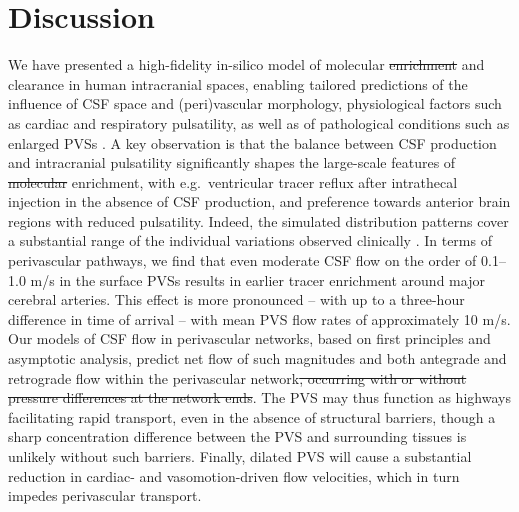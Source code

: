 \documentclass[fleqn,10pt]{wlscirep}
\providecommand{\DIFadd}[1]{{\protect\color{blue}\uwave{#1}}} %
\providecommand{\DIFdel}[1]{{\protect\color{red}\sout{#1}}}                      %
\providecommand{\DIFaddbegin}{} %
\providecommand{\DIFaddend}{} %
\providecommand{\DIFdelbegin}{} %
\providecommand{\DIFdelend}{} %
\begin{document}
\section*{Discussion}

We have presented a high-fidelity in-silico model of molecular
\DIFdelbegin \DIFdel{enrichment }\DIFdelend \DIFaddbegin \DIFadd{transport }\DIFaddend and clearance in human intracranial spaces, enabling
tailored predictions of the influence of CSF space and (peri)vascular
morphology, physiological factors such as cardiac and respiratory
pulsatility, as well as of pathological conditions such as enlarged
PVSs \DIFaddbegin \DIFadd{in the SAS}\DIFaddend . A key observation is that the balance between CSF
production and intracranial pulsatility significantly shapes the
large-scale features of \DIFdelbegin \DIFdel{molecular }\DIFdelend \DIFaddbegin \DIFadd{tracer }\DIFaddend enrichment, with e.g.~ventricular
tracer reflux after intrathecal injection in the absence of CSF
production, and preference towards anterior brain regions with reduced
pulsatility. Indeed, the simulated distribution patterns cover a
substantial range of the individual variations observed clinically
\cite{ringstad2018brain}. In terms of perivascular pathways, we find
that even moderate CSF flow on the order of 0.1--1.0 \textmu m/s in
the surface PVSs results in earlier tracer enrichment around major
cerebral arteries. This effect is more pronounced -- with up to a
three-hour difference in time of arrival -- with mean PVS flow rates
of approximately 10 \textmu m/s. Our models of CSF flow in
perivascular networks, based on first principles and asymptotic
analysis, predict net flow of such magnitudes and both antegrade and
retrograde flow within the perivascular network\DIFdelbegin \DIFdel{,
occurring with or without pressure differences at the network
ends}\DIFdelend . The PVS may thus
function as highways facilitating rapid transport, even in the absence
of structural barriers, though a sharp concentration difference
between the PVS and surrounding tissues is unlikely without such
barriers. Finally, dilated PVS \DIFaddbegin \DIFadd{in the SAS }\DIFaddend will cause a substantial reduction in
cardiac- and vasomotion-driven flow velocities, which in turn impedes
perivascular transport.

\end{document}
